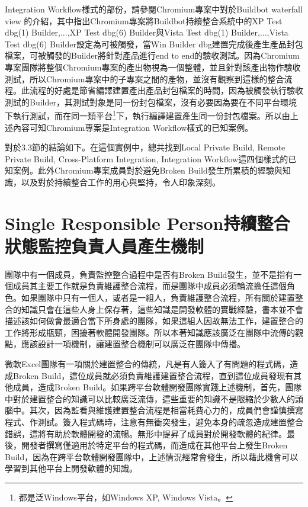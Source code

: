Integration Workflow樣式的部份，請參閱Chromium專案中對於Buildbot waterfall view 的介紹\cite{buildbotwaterfallview}，其中指出Chromium專案將Buildbot持續整合系統中的XP Test dbg(1) Builder,...,XP Test dbg(6) Builder與Vista Test dbg(1) Builder,...,Vista Test dbg(6) Builder設定為可被觸發，當Win Builder dbg建置完成後產生產品封包檔案，可被觸發的Builder將針對產品進行end to end的驗收測試。因為Chromium專案團隊將整個Chromium專案的產出物視為一個整體，並且針對該產出物作驗收測試，所以Chromium專案中的子專案之間的產物，並沒有觀察到這樣的整合流程。此流程的好處是節省編譯建置產出產品封包檔案的時間，因為被觸發執行驗收測試的Builder，其測試對象是同一份封包檔案，沒有必要因為要在不同平台環境下執行測試，而在同一類平台\footnote{都是泛Windows平台，如Windows XP, Windows Vista。}下，執行編譯建置產生同一份封包檔案。所以由上述內容可知Chromium專案是Integration Workflow樣式的已知案例。

對於3.3節的結論如下。在這個實例中，總共找到Local Private Build, Remote Private Build, Cross-Platform Integration, Integration Workflow這四個樣式的已知案例。此外Chromium專案成員對於避免Broken Build發生所累積的經驗與知識，以及對於持續整合工作的用心與堅持，令人印象深刻。

\section{Single Responsible Person持續整合狀態監控負責人員產生機制}

團隊中有一個成員，負責監控整合過程中是否有Broken Build發生，並不是指有一個成員其主要工作就是負責維護整合流程，而是團隊中成員必須輪流擔任這個角色。如果團隊中只有一個人，或者是一組人，負責維護整合流程，所有關於建置整合的知識只會在這些人身上保存著，這些知識是開發軟體的實戰經驗，書本並不會描述該如何做會最適合當下所身處的團隊，如果這組人因故無法工作，建置整合的工作將形成瓶頸，困擾著軟體開發團隊。所以本著知識應該廣泛在團隊中流傳的觀點，應該設計一項機制，讓建置整合機制可以廣泛在團隊中傳播。

微軟Excel團隊有一項關於建置整合的傳統\cite{joelonsoftware}，凡是有人簽入了有問題的程式碼，造成Broken Build，這位成員就必須負責維護建置整合流程，直到這位成員發現有其他成員，造成Broken Build。如果跨平台軟體開發團隊實踐上述機制，首先，團隊中對於建置整合的知識可以比較廣泛流傳，這些重要的知識不是限縮於少數人的頭腦中。其次，因為監看與維護建置整合流程是相當耗費心力的，成員們會謹慎撰寫程式、作測試。簽入程式碼時，注意有無衝突發生，避免本身的疏忽造成建置整合錯誤，這將有助於軟體開發的流暢。無形中提昇了成員對於開發軟體的紀律。最後，開發者撰寫僅適用於特定平台的程式碼，而造成在其他平台上發生Broken Build，因為在跨平台軟體開發團隊中，上述情況經常會發生，所以藉此機會可以學習到其他平台上開發軟體的知識。

